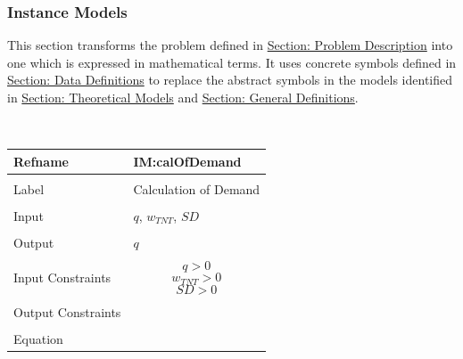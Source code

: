 \documentclass[12pt]{article}
\begin{document}
\subsubsection{Instance Models}
\label{Sec:IMs}
This section transforms the problem defined in \hyperref[Sec:ProbDesc]{Section: Problem Description} into one which is expressed in mathematical terms. It uses concrete symbols defined in \hyperref[Sec:DDs]{Section: Data Definitions} to replace the abstract symbols in the models identified in \hyperref[Sec:TMs]{Section: Theoretical Models} and \hyperref[Sec:GDs]{Section: General Definitions}.
\par~

\noindent \begin{minipage}{\textwidth}
\begin{tabular}{p{} p{}}
\toprule \textbf{Refname} & \textbf{IM:calOfDemand}
\label{IM:calOfDemand}
\\ \midrule \\
Label & Calculation of Demand
        \\ \midrule \\
        Input & $q$, ${w_{TNT}}$, $SD$
                \\ \midrule \\
                Output & $q$
                         \\ \midrule \\
                         Input Constraints & \begin{displaymath}
                                             q>0
                                             \end{displaymath}
                                             \begin{displaymath}
                                             {w_{TNT}}>0
                                             \end{displaymath}
                                             \begin{displaymath}
                                             SD>0
                                             \end{displaymath}
                                             \\ \midrule \\
                                             Output Constraints & \\ \midrule \\
                                                                  Equation & \begin{displaymath}

\end{displaymath}
\end{tabular}
\end{minipage}
\end{document}
